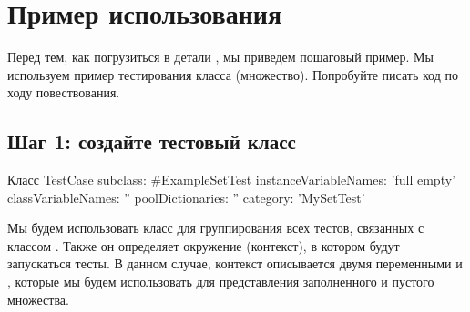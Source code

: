 \documentclass[a4paper,10pt,twoside]{book}
\begin{document}
\section{Пример использования \sunit}

Перед тем, как погрузиться в детали \SUnit, мы приведем пошаговый пример.
Мы используем пример тестирования класса  (множество).
Попробуйте писать код по ходу повествования.

\subsection{Шаг 1: создайте тестовый класс}

\dothis{Сначала вы должны создать новый подкласс класса \clsind{TestCase} под названием \ct{ExampleSetTest}.
Добавьте две переменные экземпляра класса, чтобы ваш новый класс выглядел следующим образом:}

\begin{classdef}[exampleSetTest]{Класс }
TestCase subclass: #ExampleSetTest
	instanceVariableNames: 'full empty'
	classVariableNames: ''
	poolDictionaries: ''
	category: 'MySetTest'
\end{classdef}

Мы будем использовать класс  для группирования всех тестов, связанных с классом .
Также он определяет окружение (контекст), в котором будут запускаться тесты.
В данном случае, контекст описывается двумя переменными  и ,
которые мы будем использовать для представления заполненного и пустого множества.
\end{document}
